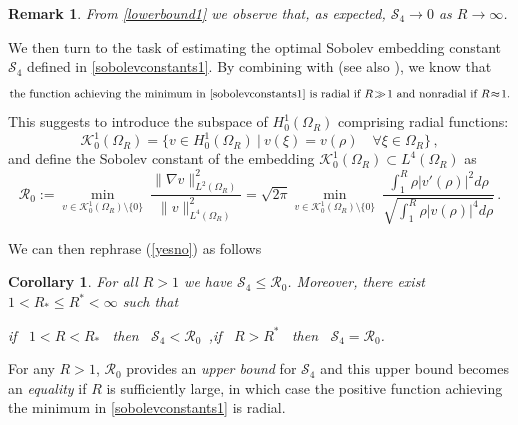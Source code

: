 \documentclass[a4paper,11pt]{article}
\newtheorem{corollary}[theorem]{Corollary}
\newtheorem{remark}[theorem]{Remark}
\numberwithin{equation}{section}
\numberwithin{figure}{section}
\def\eq#1{(\ref{#1})}
\begin{document}
\begin{remark} \label{remann}
From \eqref{lowerbound1} we observe that, as expected, $\mathcal{S}_4 \to 0$ as $R \to \infty$.
\end{remark}

We then turn to the task of estimating the optimal Sobolev embedding constant $\mathcal{S}_4$ defined in \eqref{sobolevconstants1}.
By combining \cite[Theorem 1.4]{lin1991} with \cite[Proposition 1.2]{nazarov2000one} (see also \cite[Theorem 5.3]{lin1992existence}),
we know that
\begin{equation}\label{yesno}
\mbox{the function achieving the minimum in \eqref{sobolevconstants1} is radial if $R\!\gg\!1$ and nonradial if $R\!\approx\!1$.}
\end{equation}
This suggests to introduce the subspace of $H_{0}^{1}(\Omega_{R})$ comprising radial functions:
$$
\mathcal{K}_{0}^{1}(\Omega_{R}) = \{v \in H_{0}^{1}(\Omega_{R}) \ | \ v(\xi) = v ( \rho ) \quad \forall \xi \in \Omega_R  \}\, ,
$$
and define the Sobolev constant of the embedding $\mathcal{K}_0^{1}(\Omega_{R}) \subset L^{4}(\Omega_{R})$ as
\begin{equation} \label{sobolevconstantrad}
\mathcal{R}_0 := \min_{v \in \mathcal{K}_{0}^{1}(\Omega_{R}) \setminus \{0\}} \ \dfrac{\|\nabla
v\|^2_{L^2(\Omega_{R})}}{\|v\|^{2}_{L^{4}(\Omega_{R})}} = \sqrt{2 \pi} \min_{v \in \mathcal{K}_{0}^{1}(\Omega_{R}) \setminus \{0\}} \
\dfrac{\displaystyle \int_{1}^{R} \rho |v'(\rho)|^{2} d\rho}{\displaystyle \sqrt{\int_{1}^{R} \rho |v(\rho)|^{4} d\rho}} \, .
\end{equation}

We can then rephrase \eq{yesno} as follows

\begin{corollary}\label{tobias}
For all $R > 1$ we have $\mathcal{S}_4 \leq \mathcal{R}_0$. Moreover, there exist $1<R_*\le R^*<\infty$ such that
\begin{center}
if \, $1<R<R_*$ \, then \, $\mathcal{S}_4<\mathcal{R}_0$\, ,\qquad \qquad if \, $R>R^*$ \, then \, $\mathcal{S}_4=\mathcal{R}_0$.
\end{center}
\end{corollary}

For any $R>1$, $\mathcal{R}_0$ provides an {\em upper bound} for $\mathcal{S}_4$ and this upper bound becomes an {\em equality}
if $R$ is sufficiently large, in which case the positive function achieving the minimum in \eqref{sobolevconstants1} is radial.\par
\end{document}
